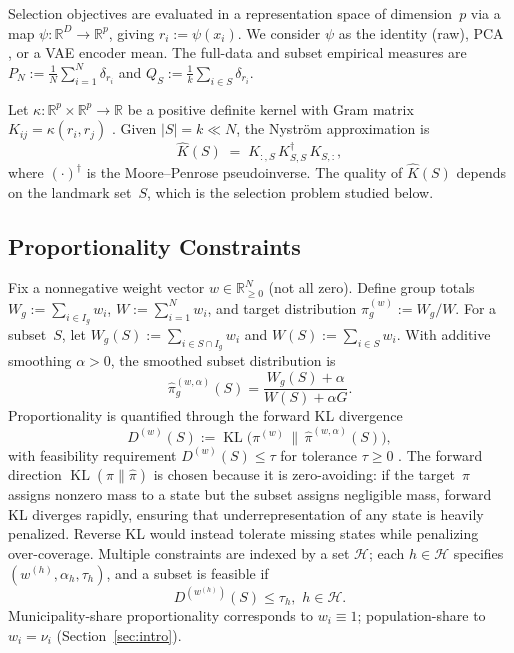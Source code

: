 \documentclass[10pt,journal]{IEEEtran}
\newcommand{\R}{\mathbb{R}}
\newcommand{\1}{\mathbf{1}}
\DeclareMathOperator{\KL}{KL}
\theoremstyle{ieeethm}
\begin{document}
Selection objectives are evaluated in a representation space of dimension~$p$ via a map
$\psi:\R^D\to\R^p$, giving $r_i:=\psi(x_i)$. We consider $\psi$ as the identity (raw), PCA
\cite{golub2013matrix}, or a VAE encoder mean. The full-data and subset empirical measures are
$P_N := \frac{1}{N}\sum_{i=1}^{N}\delta_{r_i}$ and $Q_S := \frac{1}{k}\sum_{i\in S}\delta_{r_i}$.

Let $\kappa:\R^p\times\R^p\to\R$ be a positive definite kernel with Gram matrix
$K_{ij}=\kappa(r_i,r_j)$ \cite{scholkopf2002learning,muandet2017kernel}. Given $|S|=k\ll N$,
the Nystr\"{o}m approximation \cite{williams2001nystrom,gittens2016nystrom} is
\begin{equation*}
\hat K(S) \;=\; K_{:,S}\,K_{S,S}^{\dagger}\,K_{S,:},
\end{equation*}
where $(\cdot)^\dagger$ is the Moore--Penrose pseudoinverse. The quality of $\hat K(S)$ depends
on the landmark set~$S$, which is the selection problem studied below.

\subsection{Proportionality Constraints}
\label{subsec:constraints_general}

Fix a nonnegative weight vector $w\in\R_{\ge 0}^N$ (not all zero). Define group totals
$W_g := \sum_{i\in I_g} w_i$, $W := \sum_{i=1}^N w_i$, and target distribution
$\pi_g^{(w)} := W_g/W$. For a subset~$S$, let
$W_g(S) := \sum_{i\in S\cap I_g} w_i$ and $W(S) := \sum_{i\in S} w_i$.
With additive smoothing $\alpha>0$, the smoothed subset distribution is
\begin{equation*}
\hat\pi_g^{(w,\alpha)}(S)
=
\frac{W_g(S)+\alpha}{W(S)+\alpha G}.
\end{equation*}
Proportionality is quantified through the forward KL divergence
\begin{equation*}
D^{(w)}(S)
:=
\KL\!\big(\pi^{(w)} \,\big\|\, \hat\pi^{(w,\alpha)}(S)\big),
\end{equation*}
with feasibility requirement $D^{(w)}(S) \le \tau$ for tolerance $\tau\ge 0$
\cite{villani2009ot,peyre2019ot}. The forward direction $\KL(\pi\|\hat\pi)$ is chosen
because it is zero-avoiding: if the target~$\pi$ assigns nonzero mass to a state but the
subset assigns negligible mass, forward KL diverges rapidly, ensuring that underrepresentation
of any state is heavily penalized. Reverse KL would instead tolerate missing states while
penalizing over-coverage.
Multiple constraints are indexed by a set $\mathcal{H}$; each $h\in\mathcal{H}$ specifies
$(w^{(h)},\alpha_h,\tau_h)$, and a subset is feasible if
\begin{equation}
\label{eq:multi_constraints}
D^{(w^{(h)})}(S) \le \tau_h,
\mspace{6mu} h\in\mathcal{H}.
\end{equation}
Municipality-share proportionality corresponds to $w_i\equiv 1$; population-share to
$w_i=\nu_i$ (Section~\ref{sec:intro}).
\end{document}
